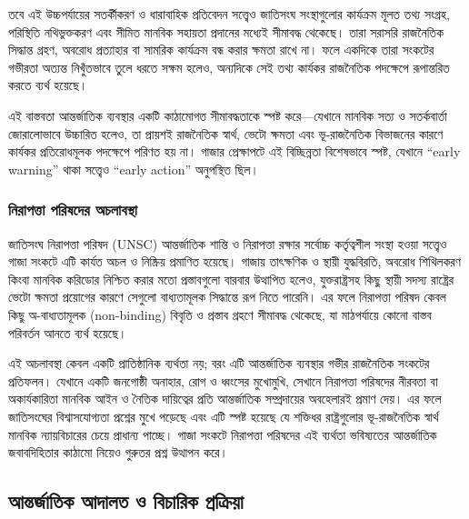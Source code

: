 তবে এই উচ্চপর্যায়ের সতর্কীকরণ ও ধারাবাহিক প্রতিবেদন সত্ত্বেও জাতিসংঘ সংস্থাগুলোর
কার্যক্রম মূলত তথ্য সংগ্রহ, পরিস্থিতি নথিভুক্তকরণ এবং সীমিত মানবিক সহায়তা
প্রদানের মধ্যেই সীমাবদ্ধ থেকেছে। তারা সরাসরি রাজনৈতিক সিদ্ধান্ত গ্রহণ, অবরোধ
প্রত্যাহার বা সামরিক কার্যক্রম বন্ধ করার ক্ষমতা রাখে না। ফলে একদিকে তারা
সংকটের গভীরতা অত্যন্ত নিখুঁতভাবে তুলে ধরতে সক্ষম হলেও, অন্যদিকে সেই তথ্য কার্যকর
রাজনৈতিক পদক্ষেপে রূপান্তরিত করতে ব্যর্থ হয়েছে।

এই বাস্তবতা আন্তর্জাতিক ব্যবস্থার একটি কাঠামোগত সীমাবদ্ধতাকে স্পষ্ট করে---যেখানে
মানবিক সত্য ও সতর্কবার্তা জোরালোভাবে উচ্চারিত হলেও, তা প্রায়শই রাজনৈতিক
স্বার্থ, ভেটো ক্ষমতা এবং ভূ-রাজনৈতিক বিভাজনের কারণে কার্যকর প্রতিরোধমূলক
পদক্ষেপে পরিণত হয় না। গাজার প্রেক্ষাপটে এই বিচ্ছিন্নতা বিশেষভাবে স্পষ্ট, যেখানে
``early warning'' থাকা সত্ত্বেও ``early action'' অনুপস্থিত ছিল।

\subsubsection{নিরাপত্তা পরিষদের
অচলাবস্থা}\label{ux9a8ux9b0ux9aaux9a4ux9a4-ux9aaux9b0ux9b7ux9a6ux9b0-ux985ux99aux9b2ux9acux9b8ux9a5}

জাতিসংঘ নিরাপত্তা পরিষদ (UNSC) আন্তর্জাতিক শান্তি ও নিরাপত্তা রক্ষার সর্বোচ্চ
কর্তৃত্বশীল সংস্থা হওয়া সত্ত্বেও গাজা সংকটে এটি কার্যত অচল ও নিষ্ক্রিয় প্রমাণিত
হয়েছে। গাজায় তাৎক্ষণিক ও স্থায়ী যুদ্ধবিরতি, অবরোধ শিথিলকরণ কিংবা মানবিক
করিডোর নিশ্চিত করার মতো প্রস্তাবগুলো বারবার উত্থাপিত হলেও, যুক্তরাষ্ট্রসহ কিছু
স্থায়ী সদস্য রাষ্ট্রের ভেটো ক্ষমতা প্রয়োগের কারণে সেগুলো বাধ্যতামূলক সিদ্ধান্তে রূপ
নিতে পারেনি। এর ফলে নিরাপত্তা পরিষদ কেবল কিছু অ-বাধ্যতামূলক (non-binding)
বিবৃতি ও প্রস্তাব গ্রহণে সীমাবদ্ধ থেকেছে, যা মাঠপর্যায়ে কোনো বাস্তব পরিবর্তন
আনতে ব্যর্থ হয়েছে।

এই অচলাবস্থা কেবল একটি প্রাতিষ্ঠানিক ব্যর্থতা নয়; বরং এটি আন্তর্জাতিক ব্যবস্থার
গভীর রাজনৈতিক সংকটের প্রতিফলন। যেখানে একটি জনগোষ্ঠী অনাহার, রোগ ও ধ্বংসের
মুখোমুখি, সেখানে নিরাপত্তা পরিষদের নীরবতা বা অকার্যকারিতা মানবিক আইন ও নৈতিক
দায়িত্বের প্রতি আন্তর্জাতিক সম্প্রদায়ের অবহেলারই প্রমাণ দেয়। এর ফলে জাতিসংঘের
বিশ্বাসযোগ্যতা প্রশ্নের মুখে পড়েছে এবং এটি স্পষ্ট হয়েছে যে শক্তিধর রাষ্ট্রগুলোর
ভূ-রাজনৈতিক স্বার্থ মানবিক ন্যায়বিচারের চেয়ে প্রাধান্য পাচ্ছে। গাজা সংকটে
নিরাপত্তা পরিষদের এই ব্যর্থতা ভবিষ্যতের আন্তর্জাতিক জবাবদিহিতার কাঠামো নিয়েও
গুরুতর প্রশ্ন উত্থাপন করে।

\subsection{আন্তর্জাতিক আদালত ও বিচারিক
প্রক্রিয়া}\label{ux986ux9a8ux9a4ux9b0ux99cux9a4ux995-ux986ux9a6ux9b2ux9a4-ux993-ux9acux99aux9b0ux995-ux9aaux9b0ux995ux9b0ux9df}

